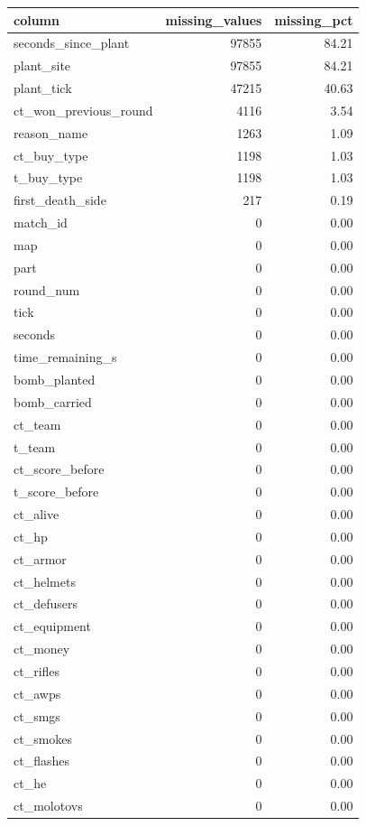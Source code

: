 \documentclass[
  letterpaper,
  DIV=11,
  numbers=noendperiod]{scrartcl}
\newcounter{none} %
\begin{document}
{\def\LTcaptype{none} %
\begin{longtable}[]{@{}lrr@{}}
\toprule\noalign{}
column & missing\_values & missing\_pct \\
\midrule\noalign{}
\endhead
\bottomrule\noalign{}
\endlastfoot
seconds\_since\_plant & 97855 & 84.21 \\
plant\_site & 97855 & 84.21 \\
plant\_tick & 47215 & 40.63 \\
ct\_won\_previous\_round & 4116 & 3.54 \\
reason\_name & 1263 & 1.09 \\
ct\_buy\_type & 1198 & 1.03 \\
t\_buy\_type & 1198 & 1.03 \\
first\_death\_side & 217 & 0.19 \\
match\_id & 0 & 0.00 \\
map & 0 & 0.00 \\
part & 0 & 0.00 \\
round\_num & 0 & 0.00 \\
tick & 0 & 0.00 \\
seconds & 0 & 0.00 \\
time\_remaining\_s & 0 & 0.00 \\
bomb\_planted & 0 & 0.00 \\
bomb\_carried & 0 & 0.00 \\
ct\_team & 0 & 0.00 \\
t\_team & 0 & 0.00 \\
ct\_score\_before & 0 & 0.00 \\
t\_score\_before & 0 & 0.00 \\
ct\_alive & 0 & 0.00 \\
ct\_hp & 0 & 0.00 \\
ct\_armor & 0 & 0.00 \\
ct\_helmets & 0 & 0.00 \\
ct\_defusers & 0 & 0.00 \\
ct\_equipment & 0 & 0.00 \\
ct\_money & 0 & 0.00 \\
ct\_rifles & 0 & 0.00 \\
ct\_awps & 0 & 0.00 \\
ct\_smgs & 0 & 0.00 \\
ct\_smokes & 0 & 0.00 \\
ct\_flashes & 0 & 0.00 \\
ct\_he & 0 & 0.00 \\
ct\_molotovs & 0 & 0.00 \\

\end{longtable}}
\end{document}
